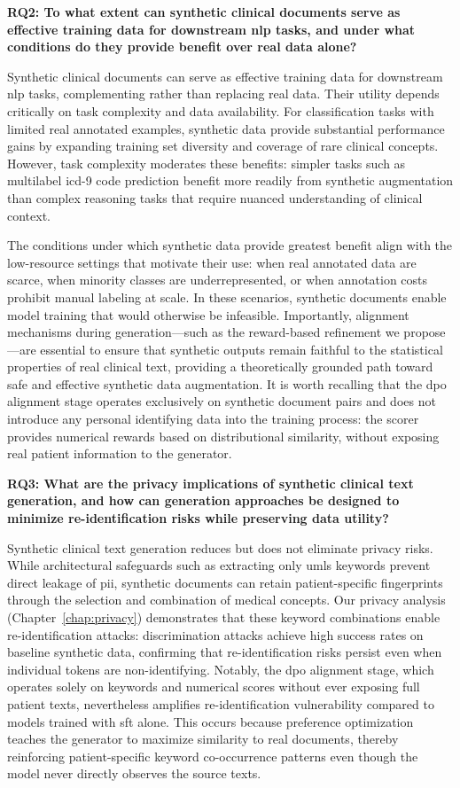 \textbf{RQ2: To what extent can synthetic clinical documents serve as effective training data for downstream \gls{nlp} tasks, and under what conditions do they provide benefit over real data alone?}

Synthetic clinical documents can serve as effective training data for downstream \gls{nlp} tasks, complementing rather than replacing real data.
Their utility depends critically on task complexity and data availability.
For classification tasks with limited real annotated examples, synthetic data provide substantial performance gains by expanding training set diversity and coverage of rare clinical concepts.
However, task complexity moderates these benefits: simpler tasks such as multilabel \gls{icd}-9 code prediction benefit more readily from synthetic augmentation than complex reasoning tasks that require nuanced understanding of clinical context.

The conditions under which synthetic data provide greatest benefit align with the low-resource settings that motivate their use: when real annotated data are scarce, when minority classes are underrepresented, or when annotation costs prohibit manual labeling at scale.
In these scenarios, synthetic documents enable model training that would otherwise be infeasible.
Importantly, alignment mechanisms during generation—such as the reward-based refinement we propose—are essential to ensure that synthetic outputs remain faithful to the statistical properties of real clinical text, providing a theoretically grounded path toward safe and effective synthetic data augmentation.
It is worth recalling that the \gls{dpo} alignment stage operates exclusively on synthetic document pairs and does not introduce any personal identifying data into the training process: the scorer provides numerical rewards based on distributional similarity, without exposing real patient information to the generator.

\textbf{RQ3: What are the privacy implications of synthetic clinical text generation, and how can generation approaches be designed to minimize re-identification risks while preserving data utility?}

Synthetic clinical text generation reduces but does not eliminate privacy risks.
While architectural safeguards such as extracting only \gls{umls} keywords prevent direct leakage of \gls{pii}, synthetic documents can retain patient-specific fingerprints through the selection and combination of medical concepts.
Our privacy analysis (Chapter~\ref{chap:privacy}) demonstrates that these keyword combinations enable re-identification attacks: discrimination attacks achieve high success rates on baseline synthetic data, confirming that re-identification risks persist even when individual tokens are non-identifying.
Notably, the \gls{dpo} alignment stage, which operates solely on keywords and numerical scores without ever exposing full patient texts, nevertheless amplifies re-identification vulnerability compared to models trained with \gls{sft} alone.
This occurs because preference optimization teaches the generator to maximize similarity to real documents, thereby reinforcing patient-specific keyword co-occurrence patterns even though the model never directly observes the source texts.

